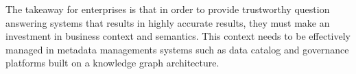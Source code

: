 \documentclass[11pt]{article}
\begin{document}
The takeaway for enterprises is that in order to provide trustworthy question answering systems that results in highly accurate results, they must make an investment in business context and semantics. This context needs to be effectively managed in metadata managements systems such as data catalog and governance platforms built on a knowledge graph architecture. 





\end{document}
